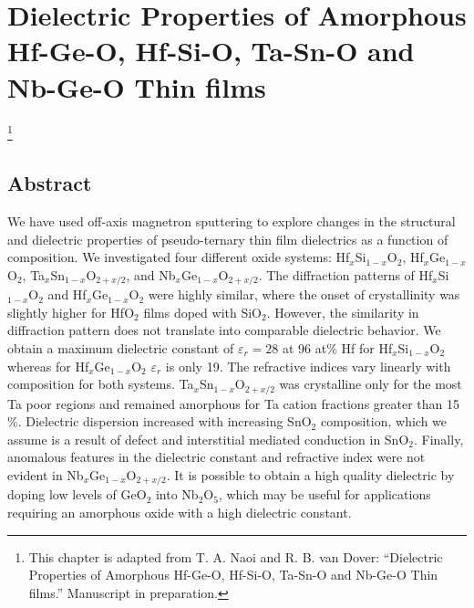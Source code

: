 \chapter{Dielectric Properties of Amorphous Hf-Ge-O, Hf-Si-O, Ta-Sn-O and Nb-Ge-O Thin films}

{\let\thefootnote\relax\footnote{{
This chapter is adapted from T. A. Naoi and R. B. van Dover: ``Dielectric Properties of Amorphous Hf-Ge-O, Hf-Si-O, Ta-Sn-O and Nb-Ge-O Thin films.'' Manuscript in preparation.
}}}

\section{Abstract}
We have used off-axis magnetron sputtering to explore changes in the structural and dielectric properties of pseudo-ternary thin film dielectrics as a function of composition. We investigated four different oxide systems: Hf$_{x}$Si$_{1-x}$O$_{2}$, Hf$_{x}$Ge$_{1-x}$O$_{2}$, Ta$_{x}$Sn$_{1-x}$O$_{2+x/2}$, and Nb$_{x}$Ge$_{1-x}$O$_{2+x/2}$. The diffraction patterns of Hf$_{x}$Si$_{1-x}$O$_{2}$ and Hf$_{x}$Ge$_{1-x}$O$_{2}$ were highly similar, where the onset of crystallinity was slightly higher for HfO$_{2}$ films doped with SiO$_{2}$. However, the similarity in diffraction pattern does not translate into comparable dielectric behavior. We obtain a maximum dielectric constant of $\varepsilon_{r} = 28$ at 96 at$\%$ Hf for Hf$_{x}$Si$_{1-x}$O$_{2}$ whereas for Hf$_{x}$Ge$_{1-x}$O$_{2}$ $\varepsilon_{r}$ is only 19. The refractive indices vary linearly with composition for both systems. Ta$_{x}$Sn$_{1-x}$O$_{2+x/2}$ was crystalline only for the most Ta poor regions and remained amorphous for Ta cation fractions greater than 15$\%$. Dielectric dispersion increased with increasing SnO$_{2}$ composition, which we assume is a result of defect and interstitial mediated conduction in SnO$_{2}$. Finally, anomalous features in the dielectric constant and refractive index were not evident in Nb$_{x}$Ge$_{1-x}$O$_{2+x/2}$. It is possible to obtain a high quality dielectric by doping low levels of GeO$_{2}$ into Nb$_{2}$O$_{5}$, which may be useful for applications requiring an amorphous oxide with a high dielectric constant.
    
